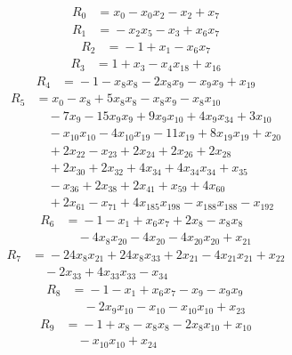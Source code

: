 \begingroup\small
\begin{align*}
R_{0}&={}x_{0} -x_{0}x_{2} -x_{2} +x_{7}
\end{align*}
\begin{align*}
R_{1}&={}-x_{2}x_{5} -x_{3} +x_{6}x_{7}
\end{align*}
\begin{align*}
R_{2}&={}-1 +x_{1} -x_{6}x_{7}
\end{align*}
\begin{align*}
R_{3}&={}1 +x_{3} -x_{4}x_{18} +x_{16}
\end{align*}
\begin{align*}
R_{4}&={}-1 -x_{8}x_{8} -2x_{8}x_{9} -x_{9}x_{9} +x_{19}
\end{align*}
\begin{align*}
R_{5}&={}x_{0} -x_{8} +5x_{8}x_{8} -x_{8}x_{9} -x_{8}x_{10}\\
&\quad{}-7x_{9} -15x_{9}x_{9} +9x_{9}x_{10} +4x_{9}x_{34} +3x_{10}\\
&\quad{}-x_{10}x_{10} -4x_{10}x_{19} -11x_{19} +8x_{19}x_{19} +x_{20}\\
&\quad{}+2x_{22} -x_{23} +2x_{24} +2x_{26} +2x_{28}\\
&\quad{}+2x_{30} +2x_{32} +4x_{34} +4x_{34}x_{34} +x_{35}\\
&\quad{}-x_{36} +2x_{38} +2x_{41} +x_{59} +4x_{60}\\
&\quad{}+2x_{61} -x_{71} +4x_{185}x_{198} -x_{188}x_{188} -x_{192}
\end{align*}
\begin{align*}
R_{6}&={}-1 -x_{1} +x_{6}x_{7} +2x_{8} -x_{8}x_{8}\\
&\quad{}-4x_{8}x_{20} -4x_{20} -4x_{20}x_{20} +x_{21}
\end{align*}
\begin{align*}
R_{7}&={}-24x_{8}x_{21} +24x_{8}x_{33} +2x_{21} -4x_{21}x_{21} +x_{22}\\
&\quad{}-2x_{33} +4x_{33}x_{33} -x_{34}
\end{align*}
\begin{align*}
R_{8}&={}-1 -x_{1} +x_{6}x_{7} -x_{9} -x_{9}x_{9}\\
&\quad{}-2x_{9}x_{10} -x_{10} -x_{10}x_{10} +x_{23}
\end{align*}
\begin{align*}
R_{9}&={}-1 +x_{8} -x_{8}x_{8} -2x_{8}x_{10} +x_{10}\\
&\quad{}-x_{10}x_{10} +x_{24}
\end{align*}

